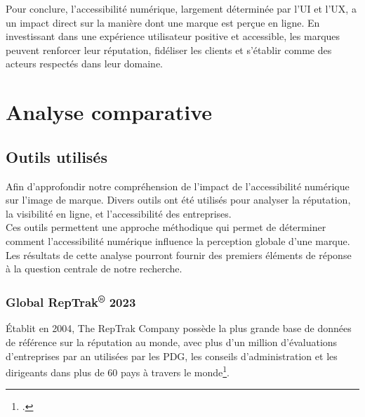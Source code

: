 \documentclass[12pt, a4paper]{report}
\begin{document}
Pour conclure, l'accessibilité numérique, largement déterminée par l'UI et l'UX, a un impact direct sur la manière dont une marque est perçue en ligne. En investissant dans une expérience utilisateur positive et accessible, les marques peuvent renforcer leur réputation, fidéliser les clients et s'établir comme des acteurs respectés dans leur domaine.

\chapter{Analyse comparative}

\section{Outils utilisés}

Afin d'approfondir notre compréhension de l'impact de l'accessibilité numérique sur l'image de marque. Divers outils ont été utilisés pour analyser la réputation, la visibilité en ligne, et l'accessibilité des entreprises.\\

Ces outils permettent une approche méthodique qui permet de déterminer comment l'accessibilité numérique influence la perception globale d'une marque. Les résultats de cette analyse pourront fournir des premiers éléments de réponse à la question centrale de notre recherche.




\subsection{Global RepTrak\textsuperscript{\tiny{®}} 2023}

Établit en 2004, The RepTrak Company possède la plus grande base de données de référence sur la réputation au monde, avec plus d'un million d'évaluations d'entreprises par an utilisées par les PDG, les conseils d'administration et les dirigeants dans plus de 60 pays à travers le monde\footcite{noauthor_reptrak_2023}.\\
\end{document}
